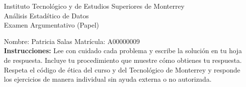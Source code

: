 \documentclass[10pt]{report}
\begin{document}
\newpage



\begin{center}
{\large Instituto Tecnol\'{o}gico y de Estudios Superiores de Monterrey \\
An\'alisis Estad\'stico de Datos } \\
Examen Argumentativo (Papel)
\end{center}

Nombre: \underline{\hspace*{.2in}}
Patricia Salas
\underline{\hspace*{.2in}} \quad Matr\'icula:\underline{\hspace*{.2in}}
A00000009
\underline{\hspace*{.2in}} \\

{\bf Instrucciones:} Lee con cuidado cada problema y escribe la soluci\'on
en tu hoja de respuesta. Incluye tu procedimiento que muestre c\'omo obtienes tu respuesta.  Respeta el c\'odigo de \'etica del curso y del Tecnol\'ogico de Monterrey y responde los ejercicios de manera individual sin ayuda externa o no autorizada.
\end{document}
